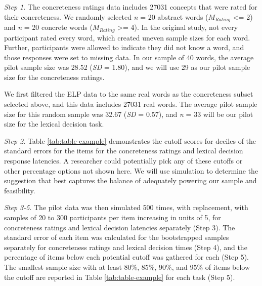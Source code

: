 \documentclass[
  man]{apa7}
\begin{document}
\emph{Step 1}. The concreteness ratings data includes 27031 concepts that were rated for their concreteness. We randomly selected \emph{n} = 20 abstract words (\(M_{Rating}\) \textless= 2) and \emph{n} = 20 concrete words (\(M_{Rating}\) \textgreater= 4). In the original study, not every participant rated every word, which created uneven sample sizes for each word. Further, participants were allowed to indicate they did not know a word, and those responses were set to missing data. In our sample of 40 words, the average pilot sample size was 28.52 (\emph{SD} = 1.80), and we will use 29 as our pilot sample size for the concreteness ratings.

We first filtered the ELP data to the same real words as the concreteness subset selected above, and this data includes 27031 real words. The average pilot sample size for this random sample was 32.67 (\emph{SD} = 0.57), and \emph{n} = 33 will be our pilot size for the lexical decision task.

\emph{Step 2}. Table \ref{tab:table-example} demonstrates the cutoff scores for deciles of the standard errors for the items for the concreteness ratings and lexical decision response latencies. A researcher could potentially pick any of these cutoffs or other percentage options not shown here. We will use simulation to determine the suggestion that best captures the balance of adequately powering our sample and feasibility.

\emph{Step 3-5}. The pilot data was then simulated 500 times, with replacement, with samples of 20 to 300 participants per item increasing in units of 5, for concreteness ratings and lexical decision latencies separately (Step 3). The standard error of each item was calculated for the bootstrapped samples separately for concreteness ratings and lexical decision times (Step 4), and the percentage of items below each potential cutoff was gathered for each (Step 5). The smallest sample size with at least 80\%, 85\%, 90\%, and 95\% of items below the cutoff are reported in Table \ref{tab:table-example} for each task (Step 5).
\end{document}
